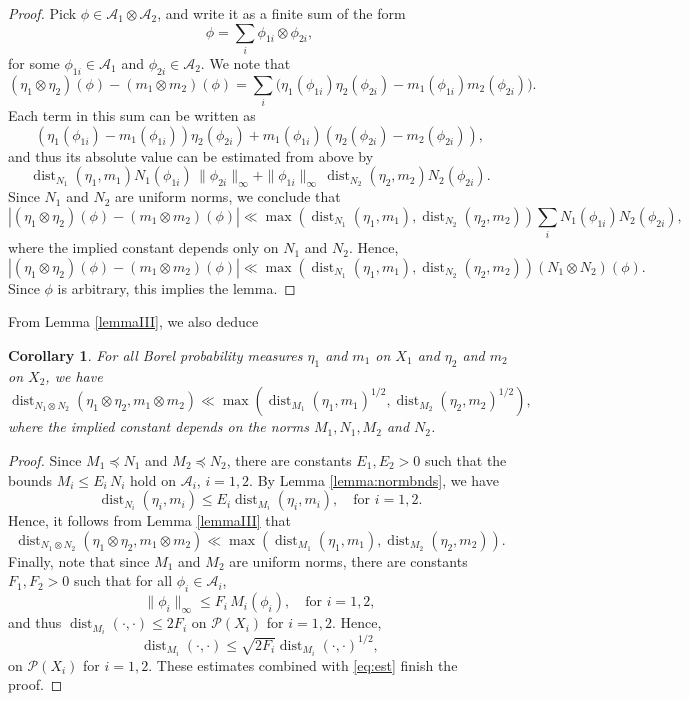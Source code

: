 \documentclass[11pt,reqno,a4paper]{amsart}
\numberwithin{equation}{section}
\newcommand{\cA}{\mathcal{A}}
\newcommand{\cP}{\mathcal{P}}
\DeclareMathOperator{\dist}{dist}
\theoremstyle{theorem}
\newtheorem{corollary}[theorem]{Corollary}
\theoremstyle{definition}
\begin{document}
\begin{proof}
Pick $\phi \in \cA_1 \otimes \cA_2$, and write it as a finite sum of the form
\[
\phi = \sum_i \phi_{1i} \otimes \phi_{2i},
\]
for some $\phi_{1i} \in \cA_1$ and $\phi_{2i} \in \cA_2$. We note that
\[
(\eta_1 \otimes \eta_2)(\phi) - (m_1 \otimes m_2)(\phi)
=
\sum_i \big( \eta_1(\phi_{1i})\eta_2(\phi_{2i}) - m_1(\phi_{1i}) m_2(\phi_{2i}) \big).
\]
Each term in this sum can be written as
\[
(\eta_1(\phi_{1i}) - m_1(\phi_{1i})) \eta_2(\phi_{2i}) + m_1(\phi_{1i}) (\eta_2(\phi_{2i}) - m_2(\phi_{2i})),
\]
and thus its absolute value can be estimated from above by
\[
\dist_{N_1}(\eta_1,m_1) N_1(\phi_{1i})\, \|\phi_{2i}\|_\infty + \|\phi_{1i}\|_\infty\,\dist_{N_2}(\eta_2,m_2)  N_2(\phi_{2i}).
\]
Since $N_1$ and $N_2$ are uniform norms, we conclude that
\[
|(\eta_1 \otimes \eta_2)(\phi) - (m_1 \otimes m_2)(\phi)|
\ll 
\max(\dist_{N_1}(\eta_1,m_1), \dist_{N_2}(\eta_2,m_2)) \sum_i N_1(\phi_{1i})N_2(\phi_{2i}),
\]
where the implied constant depends only on $N_1$ and $N_2$. 
Hence,
\[
|(\eta_1 \otimes \eta_2)(\phi) - (m_1 \otimes m_2)(\phi)|
\ll 
 \max(\dist_{N_1}(\eta_1,m_1), \dist_{N_2}(\eta_2,m_2)) (N_1\otimes N_2)(\phi).
\]
Since $\phi$ is arbitrary, this implies the lemma.
\end{proof}

From Lemma \ref{lemmaIII}, we also deduce 


\begin{corollary}
	\label{c_lemmaIII}
	For all Borel probability measures $\eta_1$ and $m_1$ on $X_1$ and $\eta_2$ and $m_2$ on $X_2$,
	we have 
	\[
	\dist_{N_1 \otimes N_2}(\eta_1 \otimes \eta_2,m_1 \otimes m_2)
	\ll 
	\max(\dist_{M_1}(\eta_1,m_1)^{1/2}, \dist_{M_2}(\eta_2,m_2)^{1/2}),
	\]
	where the implied constant depends on the norms $M_1,N_1,M_2$ and $N_2$.
\end{corollary}


\begin{proof}
Since $M_1 \preceq N_1$ and $M_2 \preceq N_2$, there are constants $E_1,E_2>0$
such that the bounds $M_i \leq E_i\, N_i$ hold on $\cA_i$, $i=1,2$. By Lemma \ref{lemma:normbnds}, we have
\[
\dist_{N_i}(\eta_i,m_i) \leq E_i \dist_{M_i}(\eta_i,m_i), \quad \textrm{for $i = 1,2$}.
\]
Hence, it follows from Lemma \ref{lemmaIII} that 
\begin{equation}
\label{eq:est}
\dist_{N_1 \otimes N_2}(\eta_1 \otimes \eta_2,m_1 \otimes m_2)
\ll
\max(\dist_{M_1}(\eta_1,m_1), \dist_{M_2}(\eta_2,m_2)).
\end{equation}
Finally, note that since $M_1$ and $M_2$ are uniform norms, there are constants $F_1, F_2 > 0$ such that for all $\phi_i\in \cA_i$,
\[
\|\phi_i\|_\infty \leq F_i\, M_i(\phi_i), \quad \textrm{for $i = 1,2$},
\]
and thus $\dist_{M_i}(\cdot,\cdot) \leq 2F_i$ on $\cP(X_i)$ for $i = 1,2$. Hence, \[
\dist_{M_i}(\cdot,\cdot) \leq \sqrt{2F_i} \dist_{M_i}(\cdot,\cdot)^{1/2},
\]
on $\cP(X_i)$ for $i = 1,2$.
These estimates combined with \eqref{eq:est} finish the proof.
\end{proof}
\end{document}
